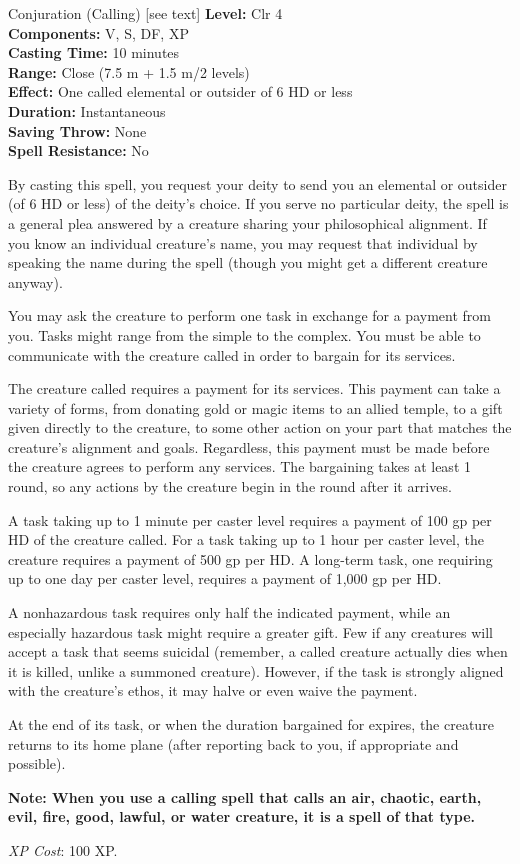 {Conjuration (Calling) [see text]}
{
	\textbf{Level:}
	Clr 4\\
	\textbf{Components:}
	V, S, DF, XP\\
	\textbf{Casting Time:}
	10 minutes\\
	\textbf{Range:}
	Close (7.5 m + 1.5 m/2 levels)\\
	\textbf{Effect:}
	One called elemental or outsider of 6 HD or less\\
	\textbf{Duration:}
	Instantaneous\\
	\textbf{Saving Throw:}
	None\\
	\textbf{Spell Resistance:}
	No\\
}
{
	By casting this spell, you request your deity to send you an elemental or outsider (of 6 HD or less) of the deity's choice. If you serve no particular deity, the spell is a general plea answered by a creature sharing your philosophical alignment. If you know an individual creature's name, you may request that individual by speaking the name during the spell (though you might get a different creature anyway).

	You may ask the creature to perform one task in exchange for a payment from you. Tasks might range from the simple to the complex. You must be able to communicate with the creature called in order to bargain for its services.

	The creature called requires a payment for its services. This payment can take a variety of forms, from donating gold or magic items to an allied temple, to a gift given directly to the creature, to some other action on your part that matches the creature's alignment and goals. Regardless, this payment must be made before the creature agrees to perform any services. The bargaining takes at least 1 round, so any actions by the creature begin in the round after it arrives.

	A task taking up to 1 minute per caster level requires a payment of 100 gp per HD of the creature called. For a task taking up to 1 hour per caster level, the creature requires a payment of 500 gp per HD. A long-term task, one requiring up to one day per caster level, requires a payment of 1,000 gp per HD.

	A nonhazardous task requires only half the indicated payment, while an especially hazardous task might require a greater gift. Few if any creatures will accept a task that seems suicidal (remember, a called creature actually dies when it is killed, unlike a summoned creature). However, if the task is strongly aligned with the creature's ethos, it may halve or even waive the payment.

	At the end of its task, or when the duration bargained for expires, the creature returns to its home plane (after reporting back to you, if appropriate and possible).

	\textbf{Note: When you use a calling spell that calls an air, chaotic, earth, evil, fire, good, lawful, or water creature, it is a spell of that type.}

	\textit{XP Cost}:
	100 XP.

}
